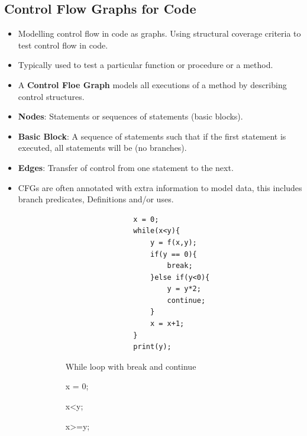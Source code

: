 \documentclass[a4paper]{article}
\begin{document}
\subsection{Control Flow Graphs for Code}
\begin{itemize}
    \item Modelling control flow in code as graphs. Using structural coverage criteria to test control flow in code.
    \item Typically used to test a particular function or procedure or a method.
    \item A \textbf{Control Floe Graph} models all executions of a method by describing control structures.
    \item \textbf{Nodes}: Statements or sequences of statements (basic blocks).
    \item \textbf{Basic Block}: A sequence of statements such that if the first statement is executed, all statements will be (no branches).
    \item \textbf{Edges}: Transfer of control from one statement to the next.
    \item CFGs are often annotated with extra information to model data, this includes branch predicates, Definitions and/or uses.
    \begin{figure}[H]
        \centering
        \begin{subfigure}[b]{0.45\textwidth}
            \begin{verbatim}
                x = 0;
                while(x<y){
                    y = f(x,y);
                    if(y == 0){
                        break;
                    }else if(y<0){
                        y = y*2;
                        continue;
                    }
                    x = x+1;
                }
                print(y);
            \end{verbatim}
            \caption{While loop with break and continue}
        \end{subfigure}
        \hfill
        \begin{subfigure}[b]{0.45\textwidth}
            \begin{myverbbox}{\vertexONE}
                x = 0;
            \end{myverbbox}
            \begin{myverbbox}{\edgeONE}
                x<y;
            \end{myverbbox}
            \begin{myverbbox}{\edgeTWO}
                x>=y;
            \end{myverbbox}

\end{subfigure}
\end{figure}
\end{itemize}
\end{document}
